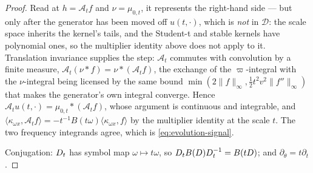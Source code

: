 \begin{proof}
Read at $h = \mathcal{A}_tf$ and $\nu = \mu_{0,t}$, it represents the right-hand side --- but
only after the generator has been moved off $u(t,\cdot)$, which is \emph{not} in $\mathcal{D}$:
the scale space inherits the kernel's tails, and the Student-t and stable kernels have
polynomial ones, so the multiplier identity above does not
apply to it. Translation invariance supplies the step: $\mathcal{A}_t$ commutes with convolution
by a finite measure, $\mathcal{A}_t(\nu * f) = \nu * (\mathcal{A}_tf)$, the exchange of the
$\varpi$-integral with the $\nu$-integral being licensed by the same bound
$\min(2\|f\|_\infty, \tfrac12t^2v^2\|f''\|_\infty)$ that makes the generator's own integral
converge. Hence $\mathcal{A}_tu(t,\cdot) = \mu_{0,t} * (\mathcal{A}_tf)$, whose argument is
continuous and integrable, and
$\langle\kappa_{\omega x},\mathcal{A}_tf\rangle = -t^{-1}B(t\omega)\langle\kappa_{\omega x},f\rangle$
by the multiplier identity at the scale $t$. The two frequency integrands agree, which is
\ref{eq:evolution-signal}.

Conjugation: $D_{t}$ has symbol map $\omega \mapsto t\omega$, so
$D_{t}B(D)D_{t}^{-1} = B(tD)$; and $\partial_\theta = t\partial_t$.
\end{proof}

